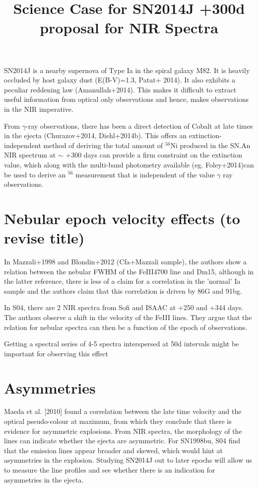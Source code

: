 \documentclass{article}
\begin{document}
\title{Science Case for SN2014J +300d proposal for NIR Spectra}
\maketitle

SN2014J is a nearby supernova of Type Ia in the spiral galaxy M82. It is heavily occluded by host galaxy dust (E(B-V)=1.3,  Patat+ 2014). It also exhibits a peculiar reddening law (Amanullah+2014). This makes it difficult to extract useful information from optical only observations and hence, makes observations in the NIR imperative. 

From $\gamma$-ray observations, there has been a direct detection of Cobalt at late times in the ejecta (Churazov+2014, Diehl+2014b). This offers an extinction-independent method of deriving the total amount of $^{56}$Ni produced in the SN.An NIR spectrum at $\sim$ +300 days can provide a firm constraint on the extinction value, which along with the multi-band photometry available (eg. Foley+2014)can be used to derive an $^{56}$ measurement that is independent of the value $\gamma$ ray observations.   


\section{Nebular epoch velocity effects (to revise title)}
In Mazzali+1998 and Blondin+2012 (Cfa+Mazzali sample), the authors show a relation between the nebular FWHM of the FeIII4700 line and Dm15, although in the latter reference, there is less of  a claim for a correlation in the 'normal' Ia sample and the authors claim that this correlation is driven by 86G and 91bg.

In S04, there are 2 NIR spectra from Sofi and ISAAC at +250 and +344 days. The authors observe a shift in the velocity of the FeIII lines. They argue that the relation for nebular spectra can then be a function of the epoch of observations.

Getting a spectral series of 4-5 spectra interspersed at 50d intervals might be important for observing this effect

\section{Asymmetries}
Maeda et al. [2010] found a correlation between the late time velocity and the optical pseudo-colour at maximum, from which they conclude that there is evidence for asymmetric explosions. 
From NIR spectra, the morphology of the lines can indicate whether the ejecta are asymmetric. For SN1998bu, S04 find that the emission lines appear broader and skewed, which would hint at asymmetries in the explosion. 
Studying SN2014J out to later epochs will allow us to measure the line profiles and see whether there is an indication for asymmetries in the ejecta. 
\end{document}
